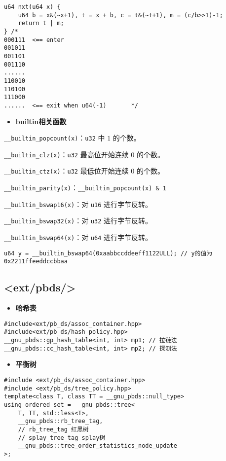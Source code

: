 \documentclass[a4paper,landscape,twocolumn]{ctexart}
\newcommand{\point}[1]{
	\begin{itemize}
		\item \textbf{#1}
	\end{itemize}
}
\begin{document}
\begin{lstlisting}
u64 nxt(u64 x) {
	u64 b = x&(~x+1), t = x + b, c = t&(~t+1), m = (c/b>>1)-1;
	return t | m;
} /*
000111  <== enter
001011
001101
001110
......
110010
110100
111000
......  <== exit when u64(-1)       */
\end{lstlisting}

\point{builtin相关函数}

\texttt{\_\_builtin\_popcount{\color{red}{ll}}(x)}：\texttt{u32{\color{red}{/u64}}} 中 $1$ 的个数。

\texttt{\_\_builtin\_clz{\color{red}{ll}}(x)}：\texttt{u32{\color{red}{/u64}}} 最高位开始连续 $0$ 的个数。

\texttt{\_\_builtin\_ctz{\color{red}{ll}}(x)}：\texttt{u32{\color{red}{/u64}}} 最低位开始连续 $0$ 的个数。

\texttt{\_\_builtin\_parity{\color{red}{ll}}(x)}：\texttt{\_\_builtin\_popcount{\color{red}{ll}}(x) \& 1}

\texttt{\_\_builtin\_bswap16(x)}：对 \texttt{u16} 进行字节反转。

\texttt{\_\_builtin\_bswap32(x)}：对 \texttt{u32} 进行字节反转。

\texttt{\_\_builtin\_bswap64(x)}：对 \texttt{u64} 进行字节反转。

\begin{lstlisting}
u64 y = __builtin_bswap64(0xaabbccddeeff1122ULL); // y的值为0x2211ffeeddccbbaa
\end{lstlisting}

\subsection{<ext/pbds/>}

\point{哈希表}

\begin{lstlisting}
#include<ext/pb_ds/assoc_container.hpp>
#include<ext/pb_ds/hash_policy.hpp>
__gnu_pbds::gp_hash_table<int, int> mp1; // 拉链法
__gnu_pbds::cc_hash_table<int, int> mp2; // 探测法
\end{lstlisting}

\point{平衡树}

\begin{lstlisting}
#include <ext/pb_ds/assoc_container.hpp>
#include <ext/pb_ds/tree_policy.hpp>
template<class T, class TT = __gnu_pbds::null_type>
using ordered_set = __gnu_pbds::tree<
	T, TT, std::less<T>,
	__gnu_pbds::rb_tree_tag,
	// rb_tree_tag 红黑树
	// splay_tree_tag splay树
	__gnu_pbds::tree_order_statistics_node_update
>;
\end{lstlisting}
\end{document}

